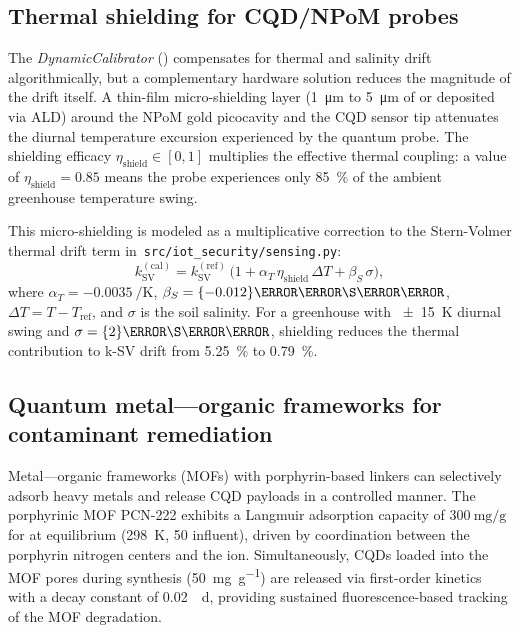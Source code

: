 \documentclass[11pt,a4paper]{article}
\begin{document}
\subsection{Thermal shielding for CQD/NPoM probes}
\label{SI-sec:thermal_shielding}

The \textit{DynamicCalibrator} () compensates for thermal
and salinity drift algorithmically, but a complementary hardware solution
reduces the magnitude of the drift itself. A thin-film micro-shielding layer
(\qty{1}{\micro\meter} to \qty{5}{\micro\meter} of  or  deposited via ALD)
around the NPoM gold picocavity and the CQD sensor tip attenuates the diurnal
temperature excursion experienced by the quantum probe. The shielding efficacy
$\eta_{\mathrm{shield}} \in [0,1]$ multiplies the effective thermal coupling:
a value of $\eta_{\mathrm{shield}} = 0.85$ means the probe experiences only
\qty{85}{\percent} of the ambient greenhouse temperature swing.

This micro-shielding is modeled as a multiplicative correction to the
Stern-Volmer thermal drift term in~\texttt{src/iot\_security/sensing.py}:
\[
k_{\mathrm{SV}}^{\mathrm{(cal)}} = k_{\mathrm{SV}}^{\mathrm{(ref)}} \,
\bigl(1 + \alpha_T \,\eta_{\mathrm{shield}}\,\Delta T +
\beta_S \,\sigma\bigr),
\]
where $\alpha_T = \qty{-0.0035}{\per\K}$, $\beta_S = \qty{-0.012}{\per\milli\S\per\cm}$,
$\Delta T = T - T_{\mathrm{ref}}$, and $\sigma$ is the soil salinity. For a
greenhouse with \qty{\pm 15}{\K} diurnal swing and
$\sigma = \qty{2}{\milli\S\per\cm}$, shielding reduces the thermal contribution
to k-SV drift from \qty{5.25}{\percent} to \qty{0.79}{\percent}.

\subsection{Quantum metal---organic frameworks for contaminant remediation}
\label{SI-sec:mof}

Metal---organic frameworks (MOFs) with porphyrin-based linkers can selectively
adsorb heavy metals and release CQD payloads in a controlled manner. The
porphyrinic MOF PCN-222 exhibits a Langmuir adsorption capacity of
$\qty{300}{\mg\per\g}$ for  at equilibrium
(\qty{298}{\K}, \qty{50}{\ppb} influent), driven by coordination between the
porphyrin nitrogen centers and the  ion.
Simultaneously, CQDs loaded into the MOF pores during synthesis
(\qty{50}{\mg\per\g}) are released via first-order kinetics with a
decay constant of \qty{0.02}{\per\day}, providing sustained
fluorescence-based tracking of the MOF degradation.
\end{document}
